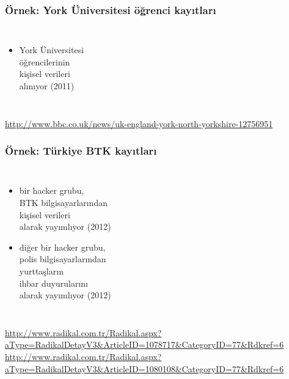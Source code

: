 \documentclass[dvipsnames]{beamer}
\theoremstyle{definition}
\theoremstyle{example}
\theoremstyle{plain}
\begin{document}
\begin{frame}
  \frametitle{Örnek: York Üniversitesi öğrenci kayıtları}

  \begin{columns}

    \begin{itemize}
      \item York Üniversitesi\\
        öğrencilerinin\\
        kişisel verileri\\
        alınıyor (2011)
    \end{itemize}
  \end{columns}

  \medskip
  \tiny{\url{http://www.bbc.co.uk/news/uk-england-york-north-yorkshire-12756951}}\\
\end{frame}

\begin{frame}
  \frametitle{Örnek: Türkiye BTK kayıtları}

  \begin{columns}

    \begin{itemize}
      \item bir hacker grubu,\\
        BTK bilgisayarlarından\\
        kişisel verileri\\
        alarak yayımlıyor (2012)
      \item diğer bir hacker grubu,\\
        polis bilgisayarlarından\\
        yurttaşların\\
        ihbar duyurularını\\
        alarak yayımlıyor (2012)
    \end{itemize}
  \end{columns}

  \medskip
  \tiny{\url{http://www.radikal.com.tr/Radikal.aspx?aType=RadikalDetayV3&ArticleID=1078717&CategoryID=77&Rdkref=6}}\\
  \tiny{\url{http://www.radikal.com.tr/Radikal.aspx?aType=RadikalDetayV3&ArticleID=1080108&CategoryID=77&Rdkref=6}}\\
\end{frame}
\end{document}
